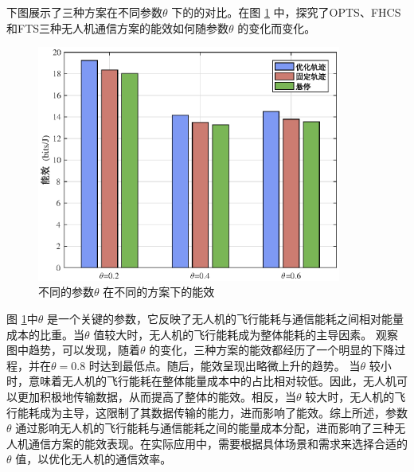 下图展示了三种方案在不同参数$\theta$ 下的的对比。在图 \ref{DifferentSchemesANDdifftheta} 中，探究了OPTS、FHCS 和FTS三种无人机通信方案的能效如何随参数$\theta$ 的变化而变化。
\begin{figure}[H]
\centering
\includegraphics[width=10cm]{figures//chap4//不同的参数在不同的方案下的能效.eps}
\caption{不同的参数$\theta$ 在不同的方案下的能效}
\label{DifferentSchemesANDdifftheta}
\end{figure}

图 \ref{DifferentSchemesANDdifftheta}中$\theta$ 是一个关键的参数，它反映了无人机的飞行能耗与通信能耗之间相对能量成本的比重。当$\theta$ 值较大时，无人机的飞行能耗成为整体能耗的主导因素。
观察图中趋势，可以发现，随着$\theta$ 的变化，三种方案的能效都经历了一个明显的下降过程，并在$\theta=0.8$ 时达到最低点。随后，能效呈现出略微上升的趋势。
当$\theta$ 较小时，意味着无人机的飞行能耗在整体能量成本中的占比相对较低。因此，无人机可以更加积极地传输数据，从而提高了整体的能效。相反，当$\theta$ 较大时，无人机的飞行能耗成为主导，这限制了其数据传输的能力，进而影响了能效。综上所述，参数$\theta$ 通过影响无人机的飞行能耗与通信能耗之间的能量成本分配，进而影响了三种无人机通信方案的能效表现。在实际应用中，需要根据具体场景和需求来选择合适的$\theta$ 值，以优化无人机的通信效率。


